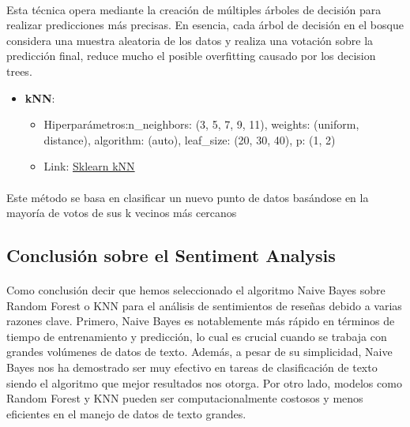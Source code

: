 \documentclass{report}
\begin{document}
{                \paragraph*{} {
                Esta técnica opera mediante la creación de múltiples árboles de decisión para realizar predicciones más precisas. En esencia, cada árbol de decisión en el bosque considera una muestra aleatoria de los datos y realiza una votación sobre la predicción final, reduce mucho el posible overfitting causado por los decision trees. 
                }
                \begin{itemize}
                    \item\textbf{kNN}:
                    \begin{itemize}
                        \item {Hiperparámetros:n\_neighbors: (3, 5, 7, 9, 11), weights: (uniform, distance), algorithm: (auto), leaf\_size: (20, 30, 40), p: (1, 2)}
                        \item Link: \href{https://scikit-learn.org/stable/modules/generated/sklearn.neighbors.KNeighborsClassifier.html}{Sklearn kNN}
                    \end{itemize} 
                \end{itemize}
                \paragraph*{}{
                Este método se basa en clasificar un nuevo punto de datos basándose en la mayoría de votos de sus k vecinos más cercanos
                }
            \subsection{Conclusión sobre el Sentiment Analysis}
                \paragraph*{}{
                    Como conclusión decir que
                    hemos seleccionado el algoritmo Naive Bayes sobre Random Forest o KNN para el análisis de sentimientos de reseñas debido a varias razones clave. Primero, Naive Bayes es notablemente más rápido en términos de tiempo de entrenamiento y predicción, lo cual es crucial cuando se trabaja con grandes volúmenes de datos de texto. Además, a pesar de su simplicidad, Naive Bayes nos ha demostrado ser muy efectivo en tareas de clasificación de texto siendo el algoritmo que mejor resultados nos otorga. Por otro lado, modelos como Random Forest y KNN pueden ser computacionalmente costosos y menos eficientes en el manejo de datos de texto grandes.
                }
}
\end{document}
